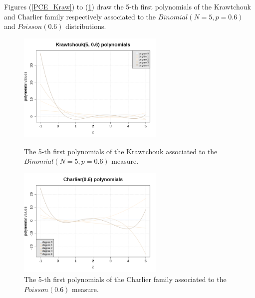              Figures (\ref{PCE_Kraw}) to (\ref{PCE_Char}) draw the  5-th first polynomials of the Krawtchouk and Charlier  family respectively associated to the $Binomial(N=5,p=0.6)$ and $Poisson(0.6)$ distributions.



             \begin{figure}[H]
               \begin{minipage}{9cm}
                 \begin{center}
                   \includegraphics[width=7cm]{Figures/PCE_KrawtchoukPolynomials.png}
                   \caption{The 5-th first polynomials of the Krawtchouk associated to the  $Binomial(N=5,p=0.6)$ measure.}
                   \label{PCE_Kraw}
                 \end{center}
               \end{minipage}
               \hfill
               \begin{minipage}{9cm}
                 \begin{center}
                   \includegraphics[width=7cm]{Figures/PCE_CharlierPolynomials.png}
                   \caption{The 5-th first polynomials of the Charlier  family associated to the $Poisson(0.6)$ measure.}
                   \label{PCE_Char}
                 \end{center}
               \end{minipage}
             \end{figure}
